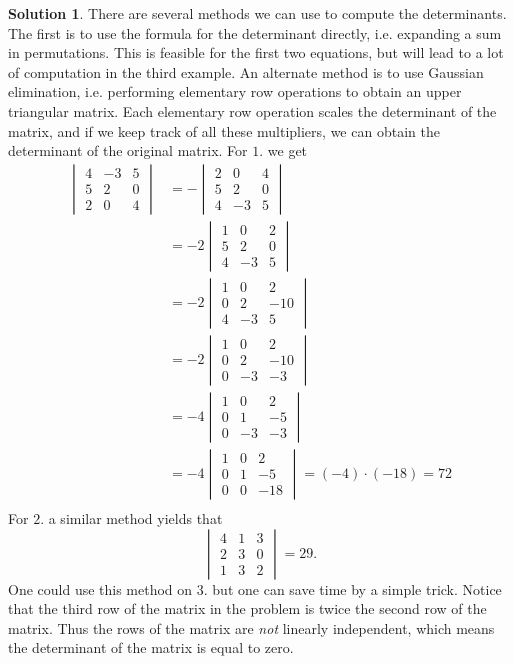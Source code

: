 \documentclass[12pt,a4paper]{article}
\theoremstyle{definition}
\newtheorem*{solution}{Solution} %
\begin{document}
\begin{solution}
	There are several methods we can use to compute the determinants. The first is to use the formula for the determinant directly, i.e. expanding a sum in permutations. This is feasible for the first two equations, but will lead to a lot of computation in the third example. An alternate method is to use Gaussian elimination, i.e. performing elementary row operations to obtain an upper triangular matrix. Each elementary row operation scales the determinant of the matrix, and if we keep track of all these multipliers, we can obtain the determinant of the original matrix. For $1.$ we get 
\begin{align*}
    \begin{vmatrix}  4 & -3 & 5 \\ 5 & 2 & 0 \\ 2 & 0 & 4 \end{vmatrix} &= -\begin{vmatrix} 2 & 0 & 4 \\ 5 & 2 & 0 \\ 4 & -3 & 5  \end{vmatrix}\\
    &= -2\begin{vmatrix} 1 & 0 & 2 \\ 5 & 2 & 0 \\ 4 & -3 & 5  \end{vmatrix}\\
    &= -2\begin{vmatrix} 1 & 0 & 2 \\ 0 & 2 & -10 \\ 4 & -3 & 5  \end{vmatrix}\\
    &= -2\begin{vmatrix} 1 & 0 & 2 \\ 0 & 2 & -10 \\ 0 & -3 & -3  \end{vmatrix}\\
    &= -4\begin{vmatrix} 1 & 0 & 2 \\ 0 & 1 & -5 \\ 0 & -3 & -3  \end{vmatrix}\\
    &= -4\begin{vmatrix} 1 & 0 & 2 \\ 0 & 1 & -5 \\ 0 & 0 & -18  \end{vmatrix}=(-4)\cdot (-18)=72\\
\end{align*}
%
 For $2.$ a similar method yields that
 \[ \begin{vmatrix}  4 & 1 & 3 \\ 2 & 3 & 0 \\ 1 & 3 & 2 \end{vmatrix}=29. \]
 One could use this method on $3.$ but one can save time by a simple trick. Notice that the third row of the matrix in the problem is twice the second row of the matrix. Thus the rows of the matrix are \emph{not} linearly independent, which means the determinant of the matrix is equal to zero.
\end{solution}
\end{document}
